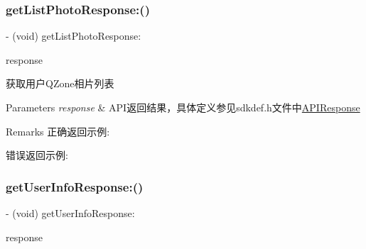 \subsubsection{\texorpdfstring{get\+List\+Photo\+Response\+:()}{getListPhotoResponse:()}\hspace{0.1cm}{\footnotesize\ttfamily [2/2]}}
{\footnotesize\ttfamily -\/ (void) get\+List\+Photo\+Response\+: \begin{DoxyParamCaption}\item[{(\mbox{\hyperlink{interface_a_p_i_response}{A\+P\+I\+Response}} $\ast$)}]{response }\end{DoxyParamCaption}\hspace{0.3cm}{\ttfamily [optional]}}

获取用户\+Q\+Zone相片列表 
\begin{DoxyParams}{Parameters}
{\em response} & A\+P\+I返回结果，具体定义参见sdkdef.\+h文件中\mbox{\hyperlink{interface_a_p_i_response}{A\+P\+I\+Response}} \\
\hline
\end{DoxyParams}
\begin{DoxyRemark}{Remarks}
正确返回示例\+: 
\begin{DoxyCodeInclude}
\end{DoxyCodeInclude}
 错误返回示例\+: 
\begin{DoxyCodeInclude}
\end{DoxyCodeInclude}

\end{DoxyRemark}
\mbox{\label{protocol_tencent_session_delegate-p_a9cff2e12ed27916e865c8048ee0c176c}} 
\subsubsection{\texorpdfstring{get\+User\+Info\+Response\+:()}{getUserInfoResponse:()}\hspace{0.1cm}{\footnotesize\ttfamily [1/2]}}
{\footnotesize\ttfamily -\/ (void) get\+User\+Info\+Response\+: \begin{DoxyParamCaption}\item[{(\mbox{\hyperlink{interface_a_p_i_response}{A\+P\+I\+Response}} $\ast$)}]{response }\end{DoxyParamCaption}\hspace{0.3cm}{\ttfamily [optional]}}

